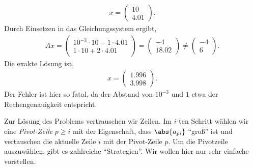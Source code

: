 \begin{bspn}
\begin{align*}
x = \begin{pmatrix}
    10\\4.01
    \end{pmatrix}.
\end{align*}
Durch Einsetzen in das Gleichungssystem ergibt,
\begin{align*}
Ax = \begin{pmatrix}
10^{-3}\cdot10 - 1\cdot4.01\\
1\cdot10 + 2 \cdot4.01
\end{pmatrix}
= \begin{pmatrix}
-4 \\ 18.02
\end{pmatrix}
\neq
\begin{pmatrix}
-4 \\ 6
\end{pmatrix}.
\end{align*}
Die exakte Lösung ist,
\begin{align*}
x = \begin{pmatrix}
1.996\\
3.998
\end{pmatrix}.
\end{align*}
Der Fehler ist hier so fatal, da der Abstand von $10^{-3}$ und $1$ etwa der
Rechengenauigkeit entspricht.\bsphere
\end{bspn}

Zur Lösung des Problems vertrauschen wir Zeilen.
Im $i$-ten Schritt wählen wir eine \emph{Pivot-Zeile} $p\ge i$ mit der
Eigenschaft, dass $\abs{a_{pi}}$ ``groß'' ist und vertauschen die aktuelle Zeile
$i$ mit der Pivot-Zeile $p$. Um die Pivotzeile auszuwählen, gibt es zahlreiche
``Strategien''. Wir wollen hier nur sehr einfache vorstellen.

